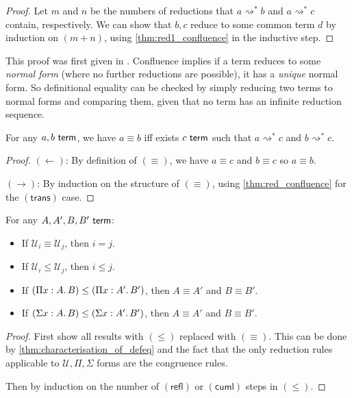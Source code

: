 \documentclass[twoside]{report}
\begin{document}
\begin{proof}
Let $m$ and $n$ be the numbers of reductions that $a\rightsquigarrow^\ast b$ and $a\rightsquigarrow^\ast c$ contain, respectively. We can show that $b, c$ reduce to some common term $d$ by induction on $(m + n)$, using \cref{thm:red1_confluence} in the inductive step.
\end{proof}

This proof was first given in \cite{martin1998intuitionistic}. Confluence implies if a term reduces to some \emph{normal form} (where no further reductions are possible), it has a \emph{unique} normal form. So definitional equality can be checked by simply reducing two terms to normal forms and comparing them, given that no term has an infinite reduction sequence.

\begin{proposition}
\label{thm:characterisation_of_defeq}
For any $a, b \ \mathsf{term}$, we have $a \equiv b$ iff exists $c \ \mathsf{term}$ such that $a\rightsquigarrow^\ast c$ and $b\rightsquigarrow^\ast c$.
\end{proposition}

\begin{proof}
$(\leftarrow)$: By definition of $(\equiv)$, we have $a \equiv c$ and $b \equiv c$ so $a \equiv b$.

$(\rightarrow)$: By induction on the structure of $(\equiv)$, using \cref{thm:red_confluence} for the $(\mathsf{trans})$ case.
\end{proof}

\begin{proposition}
\label{thm:injectivity_of_type_formers}
For any $A, A', B, B' \ \mathsf{term}$:
\begin{itemize}[noitemsep]
    \item If $\mathcal U_i \equiv \mathcal U_j$, then $i = j$.
    \item If $\mathcal U_i \leq \mathcal U_j$, then $i \leq j$.
    \item If $(\Pi{x} : {A}.\,{B}) \leq (\Pi{x} : {A'}.\,{B'})$, then $A \equiv A'$ and $B \equiv B'$.
    \item If $(\Sigma{x} : {A}.\,{B}) \leq (\Sigma{x} : {A'}.\,{B'})$, then $A \equiv A'$ and $B \equiv B'$.
\end{itemize}
\end{proposition}

\begin{proof}
First show all results with $(\leq)$ replaced with $(\equiv)$. This can be done by \cref{thm:characterisation_of_defeq} and the fact that the only reduction rules applicable to $\mathcal U, \Pi, \Sigma$ forms are the congruence rules.

Then by induction on the number of $(\mathsf{refl})$ or $(\mathsf{cuml})$ steps in $(\leq)$.
\end{proof}
\end{document}
